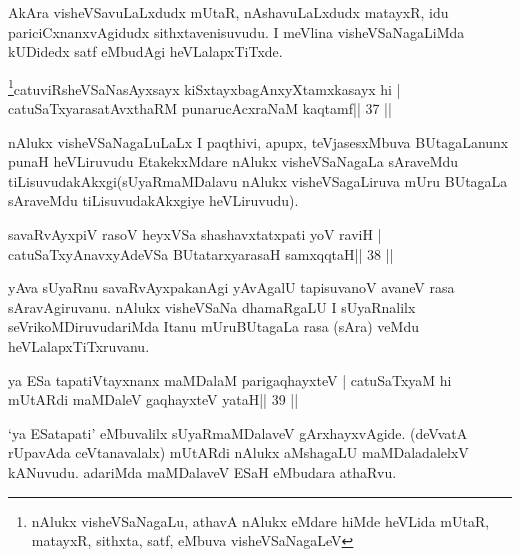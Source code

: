 \begin{artha}
AkAra visheVSavuLaLxdudx mUtaR, nAshavuLaLxdudx matayxR, idu
pariciCxnanxvAgidudx sithxtavenisuvudu. I meVlina visheVSaNagaLiMda
kUDidedx satf eMbudAgi heVLalapxTiTxde.
\end{artha}


\begin{shl}
\footnote{nAlukx visheVSaNagaLu, athavA nAlukx eMdare hiMde heVLida mUtaR, matayxR, sithxta, satf, eMbuva visheVSaNagaLeV}catuviRsheVSaNasAyxsayx kiSxtayxbagAnxyXtamxkasayx hi |
catuSaTxyarasatAvxthaRM punarucAcxraNaM kaqtamf\hfill || 37 ||
\end{shl}

\begin{artha}
nAlukx visheVSaNagaLuLaLx I paqthivi, apupx, teVjasesxMbuva BUtagaLanunx punaH heVLiruvudu EtakekxMdare nAlukx visheVSaNagaLa sAraveMdu tiLisuvudakAkxgi\break (sUyaRmaMDalavu nAlukx visheVSagaLiruva mUru BUtagaLa sAraveMdu tiLisuvudakAkxgiye heVLiruvudu).
\end{artha}



\begin{shl}
savaRvAyxpiV rasoV heyxVSa shashavxtatxpati yoV raviH |
\footnotemark[1]catuSaTxyAnavxyAdeVSa BUtatarxyarasaH samxqqtaH\hfill || 38 ||
\end{shl}

\begin{artha}
yAva sUyaRnu savaRvAyxpakanAgi yAvAgalU tapisuvanoV avaneV rasa sAravAgiruvanu. nAlukx visheVSaNa dhamaRgaLU I sUyaRnalilx seVrikoMDiruvudariMda Itanu mUruBUtagaLa rasa (sAra) veMdu heVLalapxTiTxruvanu.
\end{artha}



\begin{shl}
ya ESa tapatiVtayxnanx maMDalaM parigaqhayxteV |
catuSaTxyaM hi mUtARdi maMDaleV gaqhayxteV yataH\hfill || 39 ||
\end{shl}

\begin{artha}
`ya ESatapati' eMbuvalilx sUyaRmaMDalaveV gArxhayxvAgide. (deVvatA rUpavAda ceVtanavalalx) mUtARdi nAlukx aMshagaLU maMDaladalelxV kANuvudu. adariMda maMDalaveV ESaH eMbudara athaRvu.
\end{artha}



